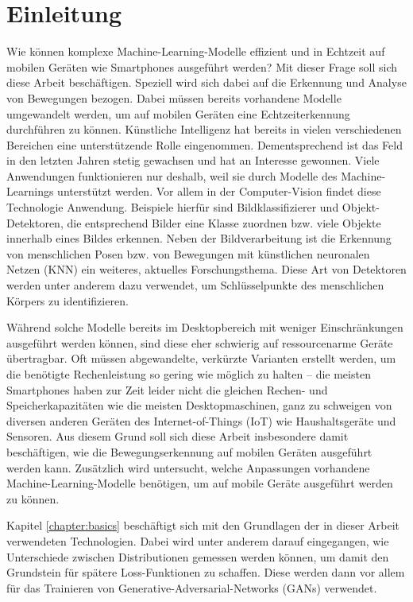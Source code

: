 \chapter{Einleitung}
Wie können komplexe Machine-Learning-Modelle effizient und in Echtzeit auf
mobilen Geräten wie Smartphones ausgeführt werden? Mit dieser Frage soll sich
diese Arbeit beschäftigen. Speziell wird sich dabei auf die Erkennung und
Analyse von Bewegungen bezogen. Dabei müssen bereits vorhandene Modelle
umgewandelt werden, um auf mobilen Geräten eine Echtzeiterkennung durchführen zu
können. Künstliche Intelligenz hat bereits in vielen verschiedenen Bereichen
eine unterstützende Rolle eingenommen.  Dementsprechend ist das Feld in den
letzten Jahren stetig gewachsen und hat an Interesse gewonnen. Viele Anwendungen
funktionieren nur deshalb, weil sie durch Modelle des Machine-Learnings
unterstützt werden. Vor allem in der Computer-Vision findet diese Technologie
Anwendung. Beispiele hierfür sind Bildklassifizierer und Objekt-Detektoren, die
entsprechend Bilder eine Klasse zuordnen bzw. viele Objekte innerhalb eines
Bildes erkennen. Neben der Bildverarbeitung ist die Erkennung von menschlichen
Posen bzw. von Bewegungen mit künstlichen neuronalen Netzen (KNN) ein weiteres,
aktuelles Forschungsthema. Diese Art von Detektoren werden unter anderem dazu
verwendet, um Schlüs\-sel\-punkte des menschlichen Körpers zu identifizieren.

Während solche Modelle bereits im Desktopbereich mit weniger Einschränkungen
ausgeführt werden können, sind diese eher schwierig auf ressourcenarme Geräte
übertragbar. Oft müssen abgewandelte, verkürzte Varianten erstellt werden, um
die benötigte Rechenleistung so gering wie möglich zu halten -- die meisten
Smartphones haben zur Zeit leider nicht die gleichen Rechen- und
Speicherkapazitäten wie die meisten Desktopmaschinen, ganz zu schweigen von
diversen anderen Geräten des Internet-of-Things (IoT) wie Haushaltsgeräte und
Sensoren. Aus diesem Grund soll sich diese Arbeit insbesondere damit
beschäftigen, wie die Bewegungserkennung auf mobilen Geräten ausgeführt werden
kann. Zusätzlich wird untersucht, welche Anpassungen vorhandene
Machine-Learning-Modelle benötigen, um auf mobile Geräte ausgeführt werden zu
können.

Kapitel \ref{chapter:basics} beschäftigt sich mit den Grundlagen der in dieser
Arbeit verwendeten Technologien. Dabei wird unter anderem darauf eingegangen,
wie Unterschiede zwischen Distributionen gemessen werden können, um damit den
Grundstein für spätere Loss-Funktionen zu schaffen. Diese werden dann vor allem
für das Trainieren von Generative-Adversarial-Networks (GANs) verwendet.

